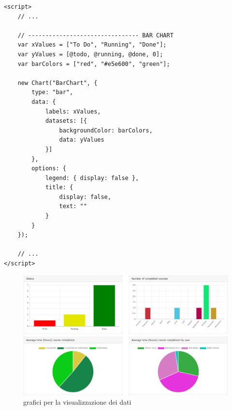 \begin{lstlisting}[style=javascript_style, caption=esempio sezione codice Javascript per la creazione di un grafico a barre per la rappresentazione dei dati]
<script>
	// ...
	
	// -------------------------------- BAR CHART
    var xValues = ["To Do", "Running", "Done"];
    var yValues = [@todo, @running, @done, 0];
    var barColors = ["red", "#e5e600", "green"];

    new Chart("BarChart", {
        type: "bar",
        data: {
            labels: xValues,
            datasets: [{
                backgroundColor: barColors,
                data: yValues
            }]
        },
        options: {
            legend: { display: false },
            title: {
                display: false,
                text: ""
            }
        }
    });

	// ...
</script>
\end{lstlisting}
%
\begin{figure}[H]
	\centering
	\includegraphics[width=\textwidth]{img/charts.png}
	\caption{grafici per la visualizzazione dei dati}
	\label{fig:charts}
\end{figure}
%
